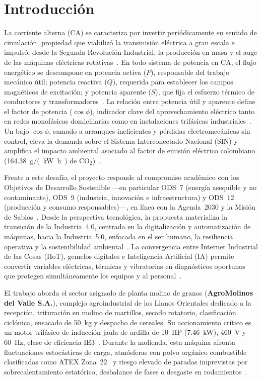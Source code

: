 \section{Introducción}\label{sec:introduccion}

La corriente alterna (CA) se caracteriza por invertir periódicamente su sentido de circulación, propiedad que viabilizó la transmisión eléctrica a gran escala e impulsó, desde la Segunda Revolución Industrial, la producción en masa y el auge de las máquinas eléctricas rotativas~\cite{Chapman2012,GuiaProyecto2026}. En todo sistema de potencia en CA, el flujo energético se descompone en potencia activa ($P$), responsable del trabajo mecánico útil; potencia reactiva ($Q$), requerida para establecer los campos magnéticos de excitación; y potencia aparente ($S$), que fija el esfuerzo térmico de conductores y transformadores~\cite{Chapman2012}. La relación entre potencia útil y aparente define el factor de potencia ($\cos\phi$), indicador clave del aprovechamiento eléctrico tanto en redes monofásicas domiciliarias como en instalaciones trifásicas industriales~\cite{GuiaProyecto2026}. Un bajo $\cos\phi$, sumado a arranques ineficientes y pérdidas electromecánicas sin control, eleva la demanda sobre el Sistema Interconectado Nacional (SIN) y amplifica el impacto ambiental asociado al factor de emisión eléctrico colombiano (\qty{164.38}{\gram/(\kilo\watt\hour)} de $\text{CO}_2$)~\cite{UPME2024}.

Frente a este desafío, el proyecto responde al compromiso académico con los Objetivos de Desarrollo Sostenible ---en particular ODS~7 (energía asequible y no contaminante), ODS~9 (industria, innovación e infraestructura) y ODS~12 (producción y consumo responsables)---, en línea con la Agenda~2030 y la Misión de Sabios~\cite{GuiaProyecto2026}. Desde la perspectiva tecnológica, la propuesta materializa la transición de la Industria~4.0, centrada en la digitalización y automatización de máquinas, hacia la Industria~5.0, enfocada en el ser humano, la resiliencia operativa y la sostenibilidad ambiental~\cite{Breque2021,Xu2021}. La convergencia entre Internet Industrial de las Cosas (IIoT), gemelos digitales e Inteligencia Artificial (IA) permite convertir variables eléctricas, térmicas y vibratorias en diagnósticos oportunos que protegen simultáneamente los equipos y al personal~\cite{Singh2023,GuiaProyecto2026}.

El trabajo aborda el sector asignado de planta molino de granos (\textbf{AgroMolinos del Valle S.A.}), complejo agroindustrial de los Llanos Orientales dedicado a la recepción, trituración en molino de martillos, secado rotatorio, clasificación ciclónica, ensacado de \qty{50}{\kilogram} y despacho de cereales. Su accionamiento crítico es un motor trifásico de inducción jaula de ardilla de \qty{10}{HP} (\qty{7.46}{\kilo\watt}), \qty{460}{\volt} y \qty{60}{\hertz}, clase de eficiencia IE3~\cite{WEG2024,IEC60034}. Durante la molienda, esta máquina afronta fluctuaciones estocásticas de carga, atmósferas con polvo orgánico combustible clasificadas como ATEX Zona~22~\cite{NFPA61} y riesgo elevado de paradas imprevistas por sobrecalentamiento estatórico, desbalance de fases o desgaste en rodamientos~\cite{Moubray1997,Nandi2005}.

